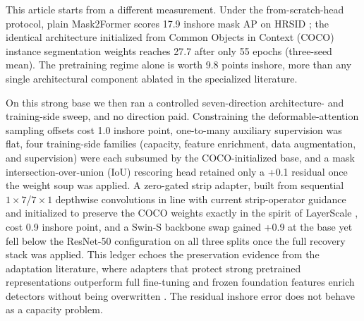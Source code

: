 This article starts from a different measurement. Under the from-scratch-head protocol, plain Mask2Former \cite{mask2former2022} scores 17.9 inshore mask AP on HRSID \cite{o2former2025}; the identical architecture initialized from Common Objects in Context (COCO) instance segmentation weights reaches 27.7 after only 55 epochs (three-seed mean). The pretraining regime alone is worth 9.8 points inshore, more than any single architectural component ablated in the specialized literature.

On this strong base we then ran a controlled seven-direction architecture- and training-side sweep, and no direction paid. Constraining the deformable-attention sampling offsets cost 1.0 inshore point, one-to-many auxiliary supervision was flat, four training-side families (capacity, feature enrichment, data augmentation, and supervision) were each subsumed by the COCO-initialized base, and a mask intersection-over-union (IoU) rescoring head retained only a +0.1 residual once the weight soup was applied. A zero-gated strip adapter, built from sequential $1\times 7$/$7\times 1$ depthwise convolutions in line with current strip-operator guidance \cite{striprcnn2026,segnext2022,inceptionnext2024} and initialized to preserve the COCO weights exactly in the spirit of LayerScale \cite{cait2021}, cost 0.9 inshore point, and a Swin-S backbone swap \cite{swin2021} gained +0.9 at the base yet fell below the ResNet-50 configuration on all three splits once the full recovery stack was applied. This ledger echoes the preservation evidence from the adaptation literature, where adapters that protect strong pretrained representations outperform full fine-tuning \cite{mona2025} and frozen foundation features enrich detectors without being overwritten \cite{frozendetr2024}. The residual inshore error does not behave as a capacity problem.

